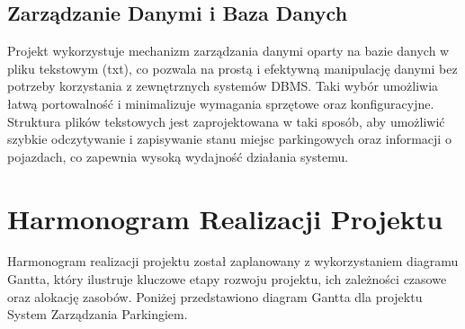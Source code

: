 \documentclass{article}
\begin{document}
\subsection{Zarządzanie Danymi i Baza Danych}
Projekt wykorzystuje mechanizm zarządzania danymi oparty na bazie danych w pliku tekstowym (txt), co pozwala na prostą i efektywną manipulację danymi bez potrzeby korzystania z zewnętrznych systemów DBMS. Taki wybór umożliwia łatwą portowalność i minimalizuje wymagania sprzętowe oraz konfiguracyjne. Struktura plików tekstowych jest zaprojektowana w taki sposób, aby umożliwić szybkie odczytywanie i zapisywanie stanu miejsc parkingowych oraz informacji o pojazdach, co zapewnia wysoką wydajność działania systemu.
\section{Harmonogram Realizacji Projektu}

Harmonogram realizacji projektu został zaplanowany z wykorzystaniem diagramu Gantta, który ilustruje kluczowe etapy rozwoju projektu, ich zależności czasowe oraz alokację zasobów. Poniżej przedstawiono diagram Gantta dla projektu System Zarządzania Parkingiem.
\end{document}
